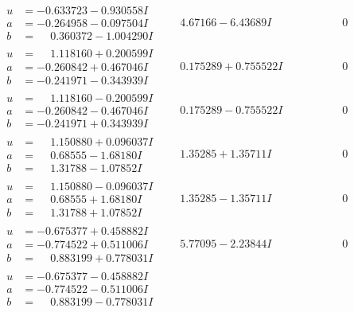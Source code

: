 \documentclass[1p]{elsarticle_modified}
\theoremstyle{definition}
\begin{document}
$$\begin{array}{c|c|c}
\begin{aligned}
u &= -0.633723 - 0.930558 I \\
a &= -0.264958 - 0.097504 I \\
b &= \phantom{-}0.360372 - 1.004290 I\end{aligned}
 & \phantom{-}4.67166 - 6.43689 I & \phantom{-0.000000 } 0 \\ \hline\begin{aligned}
u &= \phantom{-}1.118160 + 0.200599 I \\
a &= -0.260842 + 0.467046 I \\
b &= -0.241971 - 0.343939 I\end{aligned}
 & \phantom{-}0.175289 + 0.755522 I & \phantom{-0.000000 } 0 \\ \hline\begin{aligned}
u &= \phantom{-}1.118160 - 0.200599 I \\
a &= -0.260842 - 0.467046 I \\
b &= -0.241971 + 0.343939 I\end{aligned}
 & \phantom{-}0.175289 - 0.755522 I & \phantom{-0.000000 } 0 \\ \hline\begin{aligned}
u &= \phantom{-}1.150880 + 0.096037 I \\
a &= \phantom{-}0.68555 - 1.68180 I \\
b &= \phantom{-}1.31788 - 1.07852 I\end{aligned}
 & \phantom{-}1.35285 + 1.35711 I & \phantom{-0.000000 } 0 \\ \hline\begin{aligned}
u &= \phantom{-}1.150880 - 0.096037 I \\
a &= \phantom{-}0.68555 + 1.68180 I \\
b &= \phantom{-}1.31788 + 1.07852 I\end{aligned}
 & \phantom{-}1.35285 - 1.35711 I & \phantom{-0.000000 } 0 \\ \hline\begin{aligned}
u &= -0.675377 + 0.458882 I \\
a &= -0.774522 + 0.511006 I \\
b &= \phantom{-}0.883199 + 0.778031 I\end{aligned}
 & \phantom{-}5.77095 - 2.23844 I & \phantom{-0.000000 } 0 \\ \hline\begin{aligned}
u &= -0.675377 - 0.458882 I \\
a &= -0.774522 - 0.511006 I \\
b &= \phantom{-}0.883199 - 0.778031 I\end{aligned}

\end{array}$$
\end{document}

